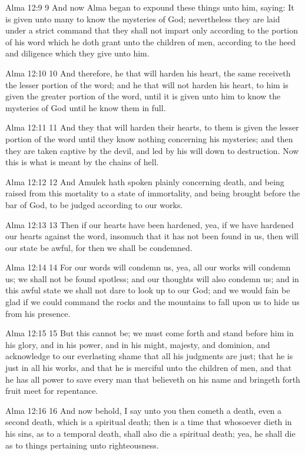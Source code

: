 Alma 12:9
 9 And now Alma began to expound these things unto him, saying:
It is given unto many to know the mysteries of God; nevertheless
they are laid under a strict command that they shall not impart
only according to the portion of his word which he doth grant
unto the children of men, according to the heed and diligence
which they give unto him.

Alma 12:10
 10 And therefore, he that will harden his heart, the same
receiveth the lesser portion of the word; and he that will not
harden his heart, to him is given the greater portion of the
word, until it is given unto him to know the mysteries of God
until he know them in full.

Alma 12:11
 11 And they that will harden their hearts, to them is given the
lesser portion of the word until they know nothing concerning his
mysteries; and then they are taken captive by the devil, and led
by his will down to destruction. Now this is what is meant by
the chains of hell.

Alma 12:12
 12 And Amulek hath spoken plainly concerning death, and being
raised from this mortality to a state of immortality, and being
brought before the bar of God, to be judged according to our
works.

Alma 12:13
 13 Then if our hearts have been hardened, yea, if we have
hardened our hearts against the word, insomuch that it has not
been found in us, then will our state be awful, for then we shall
be condemned.

Alma 12:14
 14 For our words will condemn us, yea, all our works will
condemn us; we shall not be found spotless; and our thoughts will
also condemn us; and in this awful state we shall not dare to
look up to our God; and we would fain be glad if we could command
the rocks and the mountains to fall upon us to hide us from his
presence.

Alma 12:15
 15 But this cannot be; we must come forth and stand before him
in his glory, and in his power, and in his might, majesty, and
dominion, and acknowledge to our everlasting shame that all his
judgments are just; that he is just in all his works, and that he
is merciful unto the children of men, and that he has all power
to save every man that believeth on his name and bringeth forth
fruit meet for repentance.

Alma 12:16
 16 And now behold, I say unto you then cometh a death, even a
second death, which is a spiritual death; then is a time that
whosoever dieth in his sins, as to a temporal death, shall also
die a spiritual death; yea, he shall die as to things pertaining
unto righteousness.

